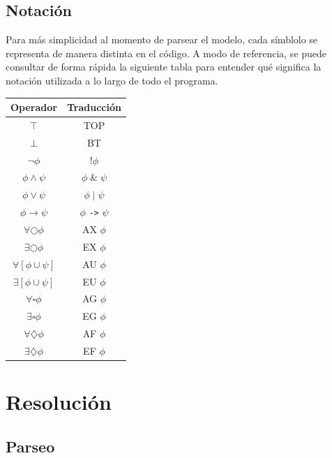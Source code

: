 \documentclass[11pt]{article}
\begin{document}
\subsection{Notación}

Para más simplicidad al momento de parsear el modelo, cada símblolo
se representa de manera distinta en el código. A modo de referencia,
se puede consultar de forma rápida la siguiente tabla para entender
qué significa la notación utilizada a lo largo de todo el programa.

\begin{center}
  \begin{tabular}{ | c | c |}
   \hline
   \textbf{Operador} & \textbf{Traducción}  \\
   \hline 
   $\top$ & TOP  \\  
   \hline
   $\bot$ & BT   \\
   \hline
   $\neg \phi$ & !$\phi$   \\
   \hline
   $\phi \land \psi$ & $\phi \;  \&  \; \psi$   \\
   \hline
   $\phi \lor \psi$ & $\phi \; | \;  \psi$   \\
   \hline
   $\phi \rightarrow \psi$ & $\phi$ \texttt{->} $\psi$   \\
   \hline
   $\forall \bigcirc \phi$ & AX  $\phi$ \\
   \hline
   $\exists \bigcirc \phi$ & EX  $\phi$ \\
   \hline
   $\forall [\phi \cup \psi]$ & AU $\phi$  \\
   \hline
   $\exists [\phi \cup \psi]$ & EU $\phi$  \\
   \hline
   $\forall \square \phi$ & AG   $\phi$\\
   \hline
   $\exists \square \phi$ & EG   $\phi$\\
   \hline
   $\forall \diamondsuit \phi$ & AF $\phi$  \\
   \hline
   $\exists \diamondsuit \phi$ & EF $\phi$   \\
   \hline
  \end{tabular}
  \end{center} 

\section{Resolución}

\subsection{Parseo}
\end{document}
